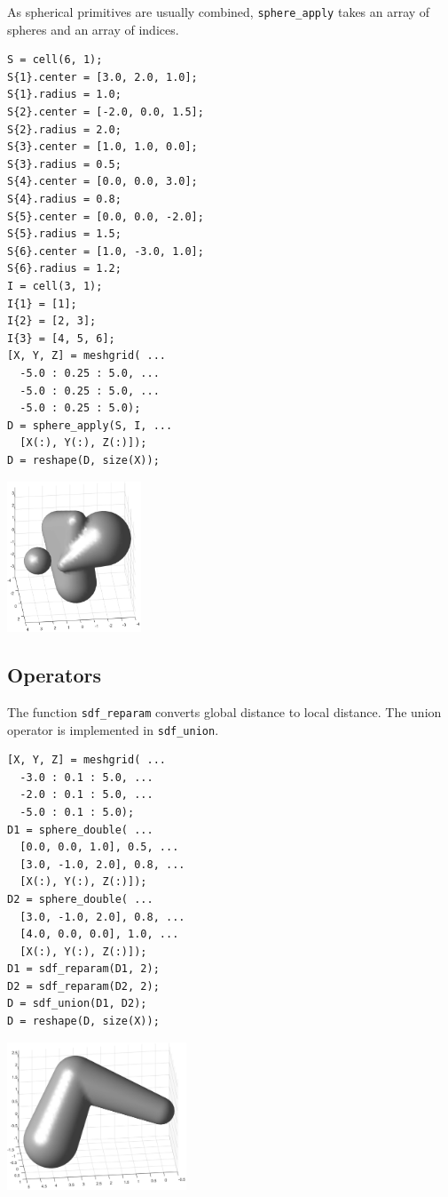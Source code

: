 \documentclass[a4paper,10pt]{article}
\begin{document}
\begin{multicols}{2}
As spherical primitives are usually combined, \lstinline!sphere_apply! takes an array of spheres and an array of indices.

\begin{lstlisting}
S = cell(6, 1);
S{1}.center = [3.0, 2.0, 1.0];
S{1}.radius = 1.0;
S{2}.center = [-2.0, 0.0, 1.5];
S{2}.radius = 2.0;
S{3}.center = [1.0, 1.0, 0.0];
S{3}.radius = 0.5;
S{4}.center = [0.0, 0.0, 3.0];
S{4}.radius = 0.8;
S{5}.center = [0.0, 0.0, -2.0];
S{5}.radius = 1.5;
S{6}.center = [1.0, -3.0, 1.0];
S{6}.radius = 1.2;
I = cell(3, 1);
I{1} = [1];
I{2} = [2, 3];
I{3} = [4, 5, 6];
[X, Y, Z] = meshgrid( ...
  -5.0 : 0.25 : 5.0, ...
  -5.0 : 0.25 : 5.0, ...
  -5.0 : 0.25 : 5.0);
D = sphere_apply(S, I, ...
  [X(:), Y(:), Z(:)]);
D = reshape(D, size(X));
\end{lstlisting}

\begin{center}
\includegraphics[width=0.3\textwidth]{figs/demo_sphere}
\end{center}


\subsection{Operators}

The function \lstinline!sdf_reparam! converts global distance to local distance.
The union operator is implemented in \lstinline!sdf_union!.

\begin{lstlisting}
[X, Y, Z] = meshgrid( ...
  -3.0 : 0.1 : 5.0, ...
  -2.0 : 0.1 : 5.0, ...
  -5.0 : 0.1 : 5.0);
D1 = sphere_double( ...
  [0.0, 0.0, 1.0], 0.5, ...
  [3.0, -1.0, 2.0], 0.8, ...
  [X(:), Y(:), Z(:)]);
D2 = sphere_double( ...
  [3.0, -1.0, 2.0], 0.8, ...
  [4.0, 0.0, 0.0], 1.0, ...
  [X(:), Y(:), Z(:)]);
D1 = sdf_reparam(D1, 2);
D2 = sdf_reparam(D2, 2);
D = sdf_union(D1, D2);
D = reshape(D, size(X));
\end{lstlisting}

\begin{center}
\includegraphics[width=0.4\textwidth]{figs/demo_union}
\end{center}


\end{multicols}
\end{document}
